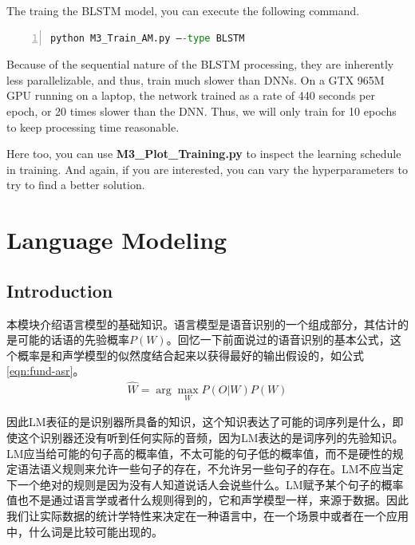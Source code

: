 The traing the BLSTM model, you can execute the following command.
\begin{lstlisting}[language = python, numbers=left, 
   numberstyle=\tiny,keywordstyle=\color{blue!70},
   commentstyle=\color{red!50!green!50!blue!50},frame=shadowbox,
   rulesepcolor=\color{red!20!green!20!blue!20},basicstyle=\ttfamily]
python M3_Train_AM.py –-type BLSTM
\end{lstlisting}

Because of the sequential nature of the BLSTM processing, they are inherently less parallelizable, and thus, train much slower than DNNs. On a GTX 965M GPU running on a laptop, the network trained as a rate of 440 seconds per epoch, or 20 times slower than the DNN. Thus, we will only train for 10 epochs to keep processing time reasonable.

Here too, you can use {\bf M3\_Plot\_Training.py} to inspect the learning schedule in training. And again, if you are interested, you can vary the hyperparameters to try to find a better solution.

\section{Language Modeling}
\subsection{Introduction} 
本模块介绍语言模型的基础知识。语言模型是语音识别的一个组成部分，其估计的是可能的话语的先验概率$P(W)$。回忆一下前面说过的语音识别的基本公式，这个概率是和声学模型的似然度结合起来以获得最好的输出假设的，如公式\ref{eqn:fund-asr}。
\begin{align}
\label{eqn:fund-asr}
  \hat{W} = \arg\mathop{\max}_{W} P(O|W)P(W)
\end{align}

因此LM表征的是识别器所具备的知识，这个知识表达了可能的词序列是什么，即使这个识别器还没有听到任何实际的音频，因为LM表达的是词序列的先验知识。LM应当给可能的句子高的概率值，不太可能的句子低的概率值，而不是硬性的规定语法语义规则来允许一些句子的存在，不允许另一些句子的存在。LM不应当定下一个绝对的规则是因为没有人知道说话人会说些什么。LM赋予某个句子的概率值也不是通过语言学或者什么规则得到的，它和声学模型一样，来源于数据。因此我们让实际数据的统计学特性来决定在一种语言中，在一个场景中或者在一个应用中，什么词是比较可能出现的。

